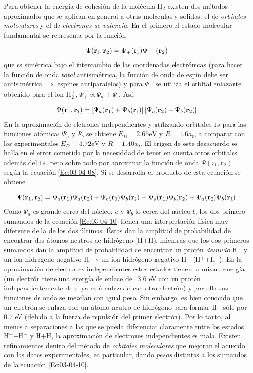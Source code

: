 Para obtener la energía de cohesión de la molécula H$_2$ existen dos métodos aproximados que se aplican en general a otras moléculas y sólidos: el de \textit{orbitales moleculares} y el de \textit{electrones de valencia}. En el primero el estado molecular fundamental se representa por la función 

\begin{equation}
    \Psi (\mathbf{r}_1, \mathbf{r}_2) = \Psi_+ (\mathbf{r}_1) \Psi+ (\mathbf{r}_2)
\end{equation}
que es simétrica bajo el intercambio de las coordenadas electrónicas (para hacer la función de onda \textit{total} antisimétrica, la función de onda de espín debe ser antisimétrica $\Rightarrow$ espines antiparalelos) y para $\Psi_+$ se utiliza el orbital enlazante obtenido para el ion H$_2^+$, $\Psi_+ \propto \Psi_a + \Psi_b$. Así:

\begin{equation}
    \Psi (\mathbf{r}_1, \mathbf{r}_2) = \left[ \Psi_a (\mathbf{r}_1)+\Psi_b (\mathbf{r}_1) \right]\left[ \Psi_a(\mathbf{r}_2)+\Psi_b(\mathbf{r}_2) \right] \label{Ec:03-04-08}
\end{equation}
En la aproximación de elctrones independientes y utilizando orbitales $1s$ para las funciones atómicas $\Psi_a$ y $\Psi_b$ se obtiene $E_D = 2.65 \unit{\eV}$ y $R=1.6a_0$, a comparar con los experimentales $E_D = 4.72 \unit{\eV}$ y $R=1.40a_0$. El origen de este desacuerdo se halla en el error cometido por la necesiddad de tener en cuenta otros orbitales además del $1s$, pero sobre todo por aproximar la función de onda $\Psi(r_1,r_2)$ según la ecuación \ref{Ec:03-04-08}. Si se desarrolla el producto de esta ecuación se obtiene 

\begin{equation}
    \Psi (\mathbf{r}_1 , \mathbf{r}_2) = \Psi_a (\mathbf{r}_1) \Psi_a (\mathbf{r}_2) + \Psi_b (\mathbf{r}_1) \Psi_b (\mathbf{r}_2) + \Psi_a (\mathbf{r}_1) \Psi_b (\mathbf{r}_2) + \Psi_a (\mathbf{r}_2) \Psi_b (\mathbf{r}_1) \label{Ec:03-04-10}
\end{equation}
Como $\Psi_a$ es grande cerca del núcleo, $a$ y $\Psi_b$ lo cerca del núcleo $b$, los dos primero sumandos de la ecuación \ref{Ec:03-04-10} tienen una interpretación física muy diferente de la de los dos últimos. Éstos dan la amplitud de probabilidad de encontrar dos átomos neutros de hidrógeno (H+H), mientras que los dos primeros sumandos dan la amplitud de probabilidad de encontrar un protón \textit{desnudo} H$^+$ y un ion hidrógeno negativo H$^+$ y un ion hidrógeno negativo H$^-$ (H$^+$+H$^-$). En la aproximación de electrones independientes estos estados tienen la misma energía (un electrón tiene una energía de enlace de 13.6 eV con un protón independientemente de si ya está enlazado con otro electrón) y por ello sus funciones de onda se mezclan con igual peso. Sin embargo, es bien conocido que un electrón se enlaza con un átomo neutro de hidrógeno para formar H$^-$ sólo por 0.7 eV (debido a la fuerza de repulsión del primer electrón). Por lo tanto, al menos a separaciones a las que se pueda diferenciar claramente entre los estados H$^+$+H$^-$ y H+H, la aproximación de electrones independientes es mala. Existen refinamientos dentro del método de \textit{orbitales moleculares} que mejoran el acuerdo con los datos experimentales, en particular, dando \textit{pesos} distintos a los sumandos de la ecuación \ref{Ec:03-04-10}.  


